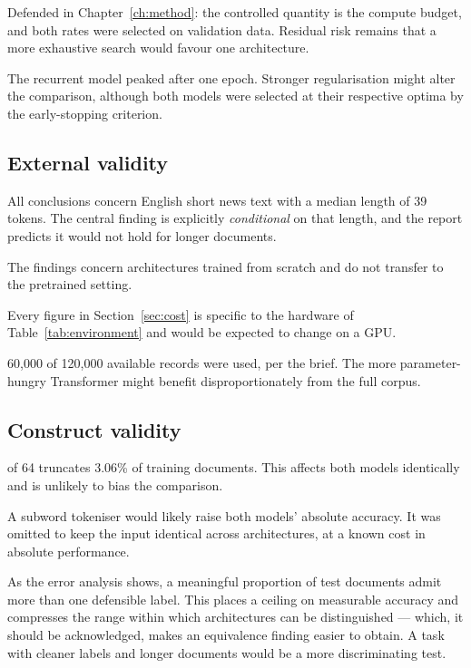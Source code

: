  Defended in Chapter~\ref{ch:method}: the controlled quantity is
the compute budget, and both rates were selected on validation data. Residual risk remains that a
more exhaustive search would favour one architecture.

 The recurrent model peaked after one epoch. Stronger
regularisation might alter the comparison, although both models were selected at their respective
optima by the early-stopping criterion.

\subsection{External validity}

 All conclusions concern English short news text with a
median length of 39 tokens. The central finding is explicitly \emph{conditional} on that length,
and the report predicts it would not hold for longer documents.

 The findings concern architectures trained from scratch and do not
transfer to the pretrained setting.

 Every figure in Section~\ref{sec:cost} is specific to the hardware of
Table~\ref{tab:environment} and would be expected to change on a GPU.

 60{,}000 of 120{,}000 available records were used, per the brief.
The more parameter-hungry Transformer might benefit disproportionately from the full corpus.

\subsection{Construct validity}

  of 64 truncates 3.06\% of training documents. This affects
both models identically and is unlikely to bias the comparison.

 A subword tokeniser would likely raise both models' absolute
accuracy. It was omitted to keep the input identical across architectures, at a known cost in
absolute performance.

 As the error analysis shows, a meaningful proportion of test documents
admit more than one defensible label. This places a ceiling on measurable accuracy and compresses
the range within which architectures can be distinguished --- which, it should be acknowledged,
makes an equivalence finding easier to obtain. A task with cleaner labels and longer documents
would be a more discriminating test.
